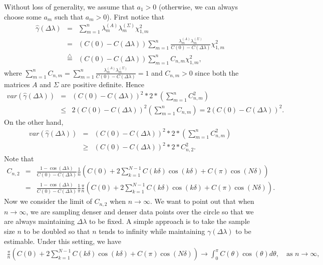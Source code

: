 Without loss of generality, we assume that $a_1 > 0$ (otherwise, we can always choose some $a_m$ such that $a_m > 0$). First notice that
\begin{eqnarray*}
\hat{\gamma}(\Delta \lambda) &=& \sum_{m = 1}^n \lambda_m^{(A)} \lambda_m^{(\Sigma)} \chi_{1,m}^2  \\
&=& (C(0) - C(\Delta \lambda)) \sum_{m = 1}^n \frac{\lambda_m^{(A)} \lambda_m^{(\Sigma)}}{C(0) - C(\Delta \lambda)} \chi_{1,m}^2  \\
&\overset{\bigtriangleup}{=}&  (C(0) - C(\Delta \lambda)) \sum_{m = 1}^n C_{n,m} \chi_{1,m}^2,
\end{eqnarray*}
where $\sum_{m=1}^n C_{n, m} = \sum_{m=1}^n \frac{\lambda_m^{(A)} \lambda_m^{(\Sigma)}}{C(0) - C(\Delta \lambda)} = 1$ and $C_{n, m} > 0$ since both the matrices $A$ and $\Sigma$ are positive definite. Hence
\begin{eqnarray*}
var(\hat{\gamma}(\Delta \lambda)) &=& (C(0) - C(\Delta \lambda))^2 * 2 * \left(\sum_{m = 1}^n C_{n,m}^2\right) \\
&\le& 2(C(0) - C(\Delta \lambda))^2\left(\sum_{m = 1}^n C_{n,m}\right) = 2(C(0) - C(\Delta \lambda))^2.
\end{eqnarray*}
On the other hand,
\begin{eqnarray*}
var(\hat{\gamma}(\Delta \lambda)) &=& (C(0) - C(\Delta \lambda))^2 * 2 * \left(\sum_{m = 1}^n C_{n,m}^2\right) \\
&\ge& (C(0) - C(\Delta \lambda))^2 * 2 * C_{n, 2}^2.
\end{eqnarray*}
Note that
\begin{eqnarray*}
C_{n, 2} &=& \frac{1 - \cos(\Delta \lambda)}{C(0) - C(\Delta \lambda)} \frac{1}{n}\left(C(0) + 2\sum_{k = 1}^{N-1}C(k\delta)\cos(k\delta) + C(\pi)\cos(N\delta)\right) \\
&=& \frac{1 - \cos(\Delta \lambda)}{C(0) - C(\Delta \lambda)} \frac{1}{\pi} \frac{\pi}{n}\left(C(0) + 2\sum_{k = 1}^{N-1}C(k\delta)\cos(k\delta) + C(\pi)\cos(N\delta)\right).
\end{eqnarray*}
Now we consider the limit of $C_{n, 2}$ when $n \to \infty$. We want to point out that when $n \to \infty$, we are sampling denser and denser data points over the circle so that we are always maintaining $\Delta \lambda$ to be fixed. A simple approach is to take the sample size $n$ to be doubled so that $n$ tends to infinity while maintaining $\gamma(\Delta \lambda)$ to be estimable. Under this setting, we have
\begin{eqnarray*}
\frac{\pi}{n}\left(C(0) + 2\sum_{k = 1}^{N-1}C(k\delta)\cos(k\delta) + C(\pi)\cos(N\delta)\right) \to \int_0^\pi C(\theta)\cos(\theta)d\theta, \quad \mbox{as $n \to \infty$},
\end{eqnarray*}
